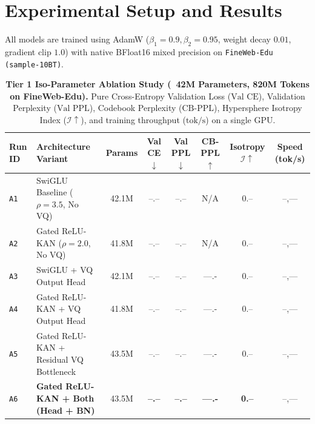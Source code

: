 \documentclass[11pt,a4paper]{article}
\begin{document}
\section{Experimental Setup and Results}

All models are trained using AdamW ($\beta_1 = 0.9, \beta_2 = 0.95$, weight decay $0.01$, gradient clip $1.0$) with native BFloat16 mixed precision on \texttt{FineWeb-Edu (sample-10BT)}.

\begin{table}[htbp]
\centering
\caption{\textbf{Tier 1 Iso-Parameter Ablation Study (~42M Parameters, 820M Tokens on FineWeb-Edu).} Pure Cross-Entropy Validation Loss ($\text{Val CE}$), Validation Perplexity ($\text{Val PPL}$), Codebook Perplexity ($\text{CB-PPL}$), Hypersphere Isotropy Index ($\mathcal{I} \uparrow$), and training throughput ($\text{tok/s}$) on a single GPU.}
\label{tab:tier1_ablations}
\small
\begin{tabular}{@{}llcccccc@{}}
\toprule
\textbf{Run ID} & \textbf{Architecture Variant} & \textbf{Params} & \textbf{Val CE} $\downarrow$ & \textbf{Val PPL} $\downarrow$ & \textbf{CB-PPL} $\uparrow$ & \textbf{Isotropy} $\mathcal{I} \uparrow$ & \textbf{Speed (tok/s)} \\
\midrule
\texttt{A1} & SwiGLU Baseline ($\rho=3.5$, No VQ) & 42.1M & --.-- & --.-- & N/A & 0.-- & --,--- \\
\texttt{A2} & Gated ReLU-KAN ($\rho=2.0$, No VQ) & 41.8M & --.-- & --.-- & N/A & 0.-- & --,--- \\
\texttt{A3} & SwiGLU + VQ Output Head & 42.1M & --.-- & --.-- & ---.- & 0.-- & --,--- \\
\texttt{A4} & Gated ReLU-KAN + VQ Output Head & 41.8M & --.-- & --.-- & ---.- & 0.-- & --,--- \\
\texttt{A5} & Gated ReLU-KAN + Residual VQ Bottleneck & 43.5M & --.-- & --.-- & ---.- & 0.-- & --,--- \\
\texttt{A6} & \textbf{Gated ReLU-KAN + Both (Head + BN)} & 43.5M & \textbf{--.--} & \textbf{--.--} & \textbf{---.-} & \textbf{0.--} & --,--- \\
\bottomrule
\end{tabular}
\end{table}
\end{document}
